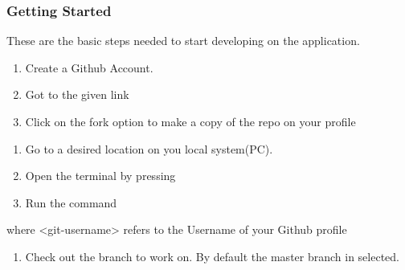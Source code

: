 \documentclass[letterpaper,10pt,english]{sphinxmanual}
\begin{document}
\subsubsection{Getting Started}
\label{\detokenize{developer:getting-started}}
These are the basic steps needed to start developing on the application.
\begin{enumerate}
%
\item {} 
Create a Github Account.

\item {} \begin{description}
\item[{Got to the given link}] \leavevmode
{}

\end{description}

\item {} 
Click on the fork option to make a copy of the repo on your profile

\end{enumerate}

\begin{enumerate}
%
\setcounter{enumi}{3}
\item {} 
Go to a desired location on you local system(PC).

\item {} 
Open the terminal by pressing 

\item {} 
Run the command

\end{enumerate}

\begin{sphinxVerbatim}[commandchars=\\\{\}]
  
\end{sphinxVerbatim}

where \textless{}git-username\textgreater{} refers to the Username of your Github profile
\begin{enumerate}
%
\setcounter{enumi}{6}
\item {} 
Check out the branch to work on. By default the master branch in selected.

\end{enumerate}
\end{document}
